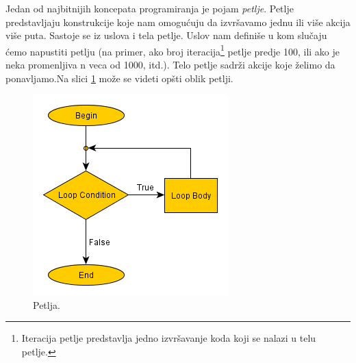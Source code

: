 \documentclass[a4paper]{article}
\begin{document}
Jedan od najbitnijih koncepata programiranja je pojam {\em petlje}. Petlje predstavljaju konstrukcije koje nam omogućuju da izvršavamo jednu ili više akcija više puta. Sastoje se iz uslova i tela petlje. Uslov nam definiše u kom slučaju ćemo napustiti petlju (na primer, ako broj iteracija\footnote{Iteracija petlje predstavlja jedno izvršavanje koda koji se nalazi u telu petlje.} petlje predje 100, ili ako je neka promenljiva n veca od 1000, itd.). Telo petlje sadrži akcije koje želimo da ponavljamo.Na slici \ref{fig:loops} može se videti opšti oblik petlji.
\begin{figure}[h!]
\begin{center}
\includegraphics[scale=0.5]{pictures/Loops.png}
\end{center}
\caption{Petlja.}
\label{fig:loops}
\end{figure}
\end{document}
